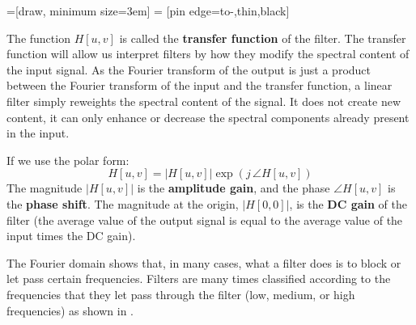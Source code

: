 \begin{center}
=[draw, minimum size=3em]
 = [pin edge={to-,thin,black}]
\end{center}
The function $H \left[u, v \right]$ is called the {\bf transfer function} of the filter. 
The transfer function will allow us interpret filters by how they modify the spectral content of the input signal. As the Fourier transform of the output is just a product between the Fourier transform of the input and the transfer function, a linear filter simply reweights the spectral content of the signal. It does not create new content, it can only enhance or decrease the spectral components already present in the input. 

If we use the polar form:
\begin{equation}
H \left[u,v \right] = \left|H \left[u, v \right] \right| \exp \left( {j \, \angle H \left[u, v \right]} \right)
\label{eq:polar-lin}
\end{equation}
The magnitude $\left| H \left[u, v \right] \right|$ is the {\bf amplitude gain}, and the phase $\angle H \left[u, v \right] $ is the {\bf phase shift}. The magnitude at the origin, $\left| H \left[0, 0 \right] \right|$, is the {\bf DC gain} of the filter (the average value of the output signal is equal to the average value of the input times the DC gain). 

The Fourier domain shows that, in many cases, what a filter does is to block or let pass certain frequencies. Filters are many times classified according to the frequencies that they let pass through the filter (low, medium, or high frequencies) as shown in \fig{\ref{fig:typestypes}}.

